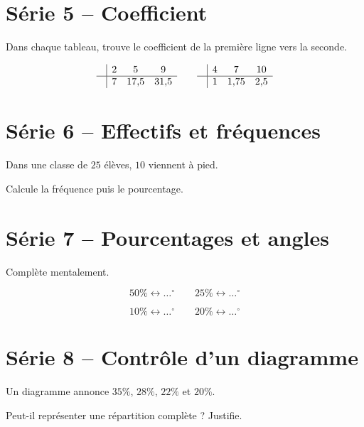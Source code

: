 \documentclass[12pt,a4paper]{article}
\begin{document}
\section*{Série 5 -- Coefficient}

Dans chaque tableau, trouve le coefficient de la première ligne vers la seconde.

\[
\begin{array}{c|ccc}
 & 2 & 5 & 9\\
\hline
 & 7 & 17{,}5 & 31{,}5
\end{array}
\qquad
\begin{array}{c|ccc}
 & 4 & 7 & 10\\
\hline
 & 1 & 1{,}75 & 2{,}5
\end{array}
\]

\section*{Série 6 -- Effectifs et fréquences}

Dans une classe de \(25\) élèves, \(10\) viennent à pied.

Calcule la fréquence puis le pourcentage.

\section*{Série 7 -- Pourcentages et angles}

Complète mentalement.

\[
50\%\longleftrightarrow\ldots^\circ
\qquad
25\%\longleftrightarrow\ldots^\circ
\]

\[
10\%\longleftrightarrow\ldots^\circ
\qquad
20\%\longleftrightarrow\ldots^\circ
\]

\section*{Série 8 -- Contrôle d'un diagramme}

Un diagramme annonce \(35\%\), \(28\%\), \(22\%\) et \(20\%\).

Peut-il représenter une répartition complète ? Justifie.
\end{document}
